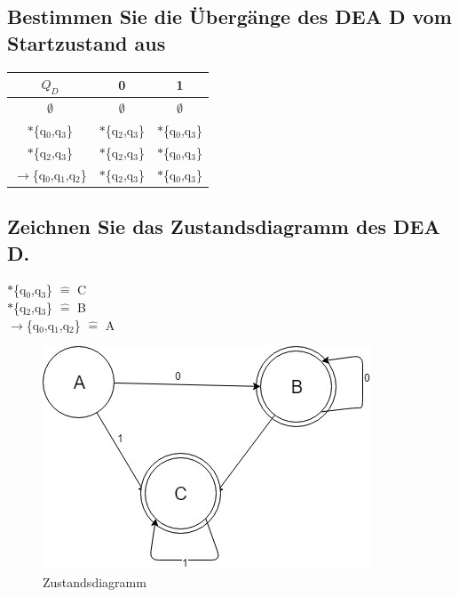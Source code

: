 \documentclass[11pt]{article} %
\begin{document}
\subsection{ Bestimmen Sie die Übergänge des DEA D vom Startzustand aus }
\begin{tabular}{c|c|c}
$Q_{D}$&0&1\\
\hline
$\emptyset$ &$\emptyset$&$\emptyset$\\
$\ast$\{q$_{0}$,q$_{3}$\}&$\ast$\{q$_{2}$,q$_{3}$\}&$\ast$\{q$_{0}$,q$_{3}$\}\\
$\ast$\{q$_{2}$,q$_{3}$\}&$\ast$\{q$_{2}$,q$_{3}$\}&$\ast$\{q$_{0}$,q$_{3}$\}\\
$\to$\{q$_{0}$,q$_{1}$,q$_{2}$\}&$\ast$\{q$_{2}$,q$_{3}$\}&$\ast$\{q$_{0}$,q$_{3}$\}\\
\end{tabular}
\subsection{Zeichnen Sie das Zustandsdiagramm des DEA D.}
$\ast$\{q$_{0}$,q$_{3}$\} $\widehat{=}$ C\\
$\ast$\{q$_{2}$,q$_{3}$\} $\widehat{=}$  B\\
$\to$\{q$_{0}$,q$_{1}$,q$_{2}$\} $\widehat{=}$ A\\
\begin{figure}
	\centering
	\includegraphics{zustand.jpg}
	\caption{Zustandsdiagramm}
\end{figure}
\end{document}

